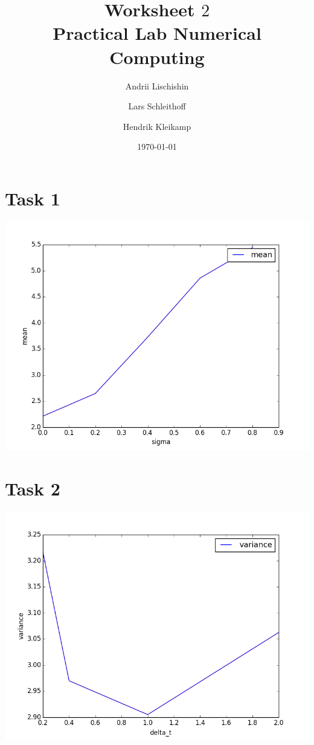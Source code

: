 \documentclass[10pt,a4paper]{article}
\begin{document}
\title{Worksheet $2$\\
\small{Practical Lab Numerical Computing}}
\author{Andrii Lischishin \and Lars Schleithoff \and Hendrik Kleikamp}
\date{\today}
\maketitle

\section*{Task 1}

\begin{center}
\includegraphics[scale=0.5]{task_1.png}		
\end{center}	

\section*{Task 2}

\begin{center}
\includegraphics[scale=0.5]{task_2.png}		
\end{center}	
\end{document}

